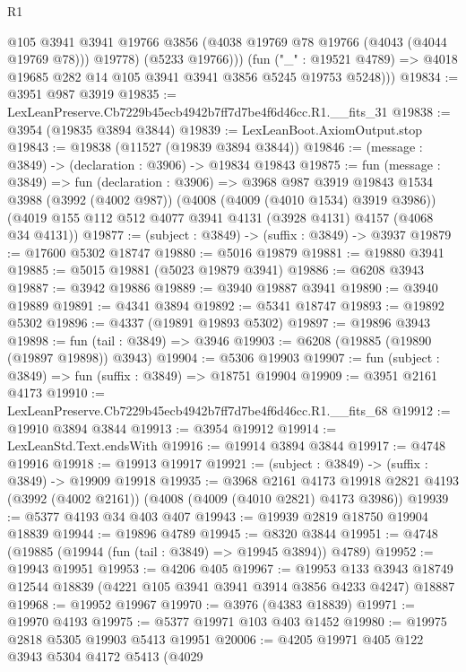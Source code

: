\begin{lexlean}{R1}
\begin{coremodule}
              @105
              @3941
              @3941
              @19766
              @3856
              (@4038 @19769 @78 @19766 (@4043 (@4044 @19769 @78)))
              @19778)
            (@5233 @19766)))
        (fun ("_" : @19521 @4789) =>
        @4018 @19685 @282 @14 @105 @3941 @3941 @3856 @5245 @19753 @5248)))
@19834 := @3951 @987 @3919
@19835 := LexLeanPreserve.Cb7229b45ecb4942b7ff7d7be4f6d46cc.R1.__fits_31
@19838 := @3954 (@19835 @3894 @3844)
@19839 := LexLeanBoot.AxiomOutput.stop
@19843 := @19838 (@11527 (@19839 @3894 @3844))
@19846 := (message : @3849) -> (declaration : @3906) -> @19834 @19843
@19875 := fun (message : @3849) =>
  fun (declaration : @3906) =>
  @3968
    @987
    @3919
    @19843
    @1534
    @3988
    (@3992 (@4002 @987))
    (@4008 (@4009 (@4010 @1534) @3919 @3986))
    (@4019 @155 @112 @512 @4077 @3941 @4131 (@3928 @4131) @4157 (@4068 @34 @4131))
@19877 := (subject : @3849) -> (suffix : @3849) -> @3937
@19879 := @17600 @5302 @18747
@19880 := @5016 @19879
@19881 := @19880 @3941
@19885 := @5015 @19881 (@5023 @19879 @3941)
@19886 := @6208 @3943
@19887 := @3942 @19886
@19889 := @3940 @19887 @3941
@19890 := @3940 @19889
@19891 := @4341 @3894
@19892 := @5341 @18747
@19893 := @19892 @5302
@19896 := @4337 (@19891 @19893 @5302)
@19897 := @19896 @3943
@19898 := fun (tail : @3849) => @3946
@19903 := @6208 (@19885 (@19890 (@19897 @19898)) @3943)
@19904 := @5306 @19903
@19907 := fun (subject : @3849) => fun (suffix : @3849) => @18751 @19904
@19909 := @3951 @2161 @4173
@19910 := LexLeanPreserve.Cb7229b45ecb4942b7ff7d7be4f6d46cc.R1.__fits_68
@19912 := @19910 @3894 @3844
@19913 := @3954 @19912
@19914 := LexLeanStd.Text.endsWith
@19916 := @19914 @3894 @3844
@19917 := @4748 @19916
@19918 := @19913 @19917
@19921 := (subject : @3849) -> (suffix : @3849) -> @19909 @19918
@19935 := @3968
    @2161
    @4173
    @19918
    @2821
    @4193
    (@3992 (@4002 @2161))
    (@4008 (@4009 (@4010 @2821) @4173 @3986))
@19939 := @5377 @4193 @34 @403 @407
@19943 := @19939 @2819 @18750 @19904 @18839
@19944 := @19896 @4789
@19945 := @8320 @3844
@19951 := @4748 (@19885 (@19944 (fun (tail : @3849) => @19945 @3894)) @4789)
@19952 := @19943 @19951
@19953 := @4206 @405
@19967 := @19953
    @133
    @3943
    @18749
    @12544
    @18839
    (@4221 @105 @3941 @3941 @3914 @3856 @4233 @4247)
    @18887
@19968 := @19952 @19967
@19970 := @3976 (@4383 @18839)
@19971 := @19970 @4193
@19975 := @5377 @19971 @103 @403 @1452
@19980 := @19975 @2818 @5305 @19903 @5413 @19951
@20006 := @4205
    @19971
    @405
    @122
    @3943
    @5304
    @4172
    @5413
    (@4029

\end{coremodule}
\end{lexlean}
